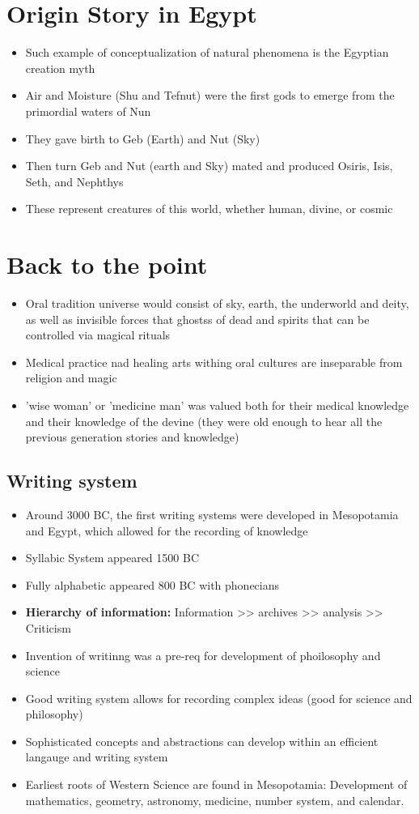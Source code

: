 \documentclass{article}
\begin{document}
\section*{Origin Story in Egypt}
\begin{itemize}
  \item Such example of conceptualization of natural phenomena
    is the Egyptian creation myth
  \item Air and Moisture (Shu and Tefnut) were the first
    gods to emerge from the primordial waters of Nun
  \item They gave birth to Geb (Earth) and Nut (Sky)
  \item Then turn Geb and Nut (earth and Sky) mated and produced Osiris, Isis, Seth, and Nephthys
  \item These represent creatures of this world, whether human, divine, or cosmic
\end{itemize}

\section*{Back to the point}
\begin{itemize}
  \item Oral tradition universe would consist of sky, earth, the underworld and deity, as
    well as invisible forces that ghostss of dead and
    spirits that can be controlled via magical rituals
  \item Medical practice nad healing arts withing oral cultures are inseparable from religion and magic
  \item 'wise woman' or 'medicine man' was valued both for their medical knowledge and their knowledge
    of the devine (they were old enough to hear all the previous generation stories and knowledge)
\end{itemize}

\subsection{Writing system}
\begin{itemize}
  \item Around 3000 BC, the first writing systems were developed
    in Mesopotamia and Egypt, which allowed for the recording of knowledge
  \item Syllabic System appeared 1500 BC
  \item  Fully alphabetic appeared 800 BC with phonecians
\item \textbf{Hierarchy of information:}
    Information >> archives >> analysis >> Criticism
  \item Invention of writinng was a pre-req for development of phoilosophy and science
  \item Good writing system allows for recording complex ideas (good for science and philosophy)
  \item Sophisticated concepts and abstractions can develop within an efficient langauge and writing system
  \item Earliest roots of Western Science are found in Mesopotamia:
    Development of mathematics, geometry, astronomy, medicine, number system, and calendar.
\end{itemize}
\end{document}
